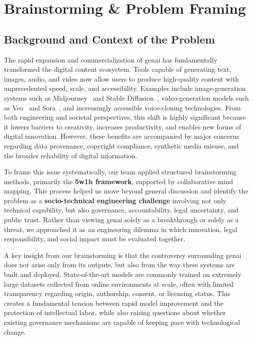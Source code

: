 \section{Brainstorming \& Problem Framing}\label{sec:brainstorming}

\subsection{Background and Context of the Problem}\label{sec:background}
The rapid expansion and commercialization of \ac{genai} has fundamentally transformed the digital content ecosystem. Tools capable of generating text, images, audio, and video now allow users to produce high-quality content with unprecedented speed, scale, and accessibility. Examples include image-generation systems such as Midjourney~\cite{midjourney} and Stable Diffusion~\cite{stable-diffusion}, video-generation models such as Veo~\cite{veo} and Sora~\cite{sora}, and increasingly accessible voice-cloning technologies. From both engineering and societal perspectives, this shift is highly significant because it lowers barriers to creativity, increases productivity, and enables new forms of digital innovation. However, these benefits are accompanied by major concerns regarding data provenance, copyright compliance, synthetic media misuse, and the broader reliability of digital information.

To frame this issue systematically, our team applied structured brainstorming methods, primarily the \textbf{\ac{5w1h} framework}, supported by collaborative mind mapping. This process helped us move beyond general discussion and identify the problem as a \textbf{socio-technical engineering challenge} involving not only technical capability, but also governance, accountability, legal uncertainty, and public trust. Rather than viewing \ac{genai} solely as a breakthrough or solely as a threat, we approached it as an engineering dilemma in which innovation, legal responsibility, and social impact must be evaluated together.

A key insight from our brainstorming is that the controversy surrounding \ac{genai} does not arise only from its outputs, but also from the way these systems are built and deployed. State-of-the-art models are commonly trained on extremely large datasets collected from online environments at scale, often with limited transparency regarding origin, authorship, consent, or licensing status. This creates a fundamental tension between rapid model improvement and the protection of intellectual labor, while also raising questions about whether existing governance mechanisms are capable of keeping pace with technological change.

